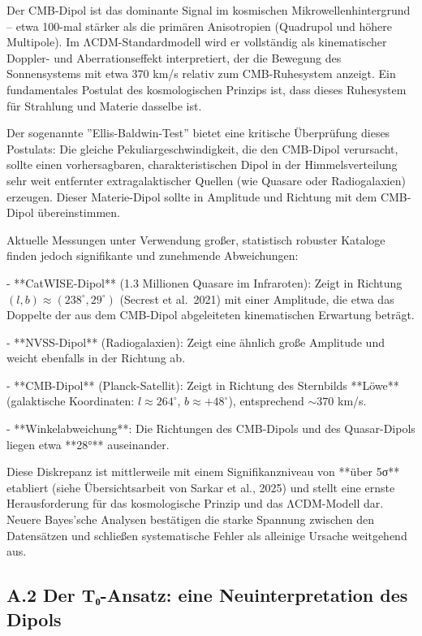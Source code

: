 Der CMB-Dipol ist das dominante Signal im kosmischen Mikrowellenhintergrund – etwa 100-mal stärker als die primären Anisotropien (Quadrupol und höhere Multipole). Im ΛCDM-Standardmodell wird er vollständig als kinematischer Doppler- und Aberrationseffekt interpretiert, der die Bewegung des Sonnensystems mit etwa 370 km/s relativ zum CMB-Ruhesystem anzeigt. Ein fundamentales Postulat des kosmologischen Prinzips ist, dass dieses Ruhesystem für Strahlung und Materie dasselbe ist.

Der sogenannte ''Ellis-Baldwin-Test'' bietet eine kritische Überprüfung dieses Postulats: Die gleiche Pekuliargeschwindigkeit, die den CMB-Dipol verursacht, sollte einen vorhersagbaren, charakteristischen Dipol in der Himmelsverteilung sehr weit entfernter extragalaktischer Quellen (wie Quasare oder Radiogalaxien) erzeugen. Dieser Materie-Dipol sollte in Amplitude und Richtung mit dem CMB-Dipol übereinstimmen.

Aktuelle Messungen unter Verwendung großer, statistisch robuster Kataloge finden jedoch signifikante und zunehmende Abweichungen:

- **CatWISE-Dipol** (1.3 Millionen Quasare im Infraroten): Zeigt in Richtung $(l, b) \approx (238^\circ, 29^\circ)$ (Secrest et al.\ 2021) mit einer Amplitude, die etwa das Doppelte der aus dem CMB-Dipol abgeleiteten kinematischen Erwartung beträgt.

- **NVSS-Dipol** (Radiogalaxien): Zeigt eine ähnlich große Amplitude und weicht ebenfalls in der Richtung ab.

- **CMB-Dipol** (Planck-Satellit): Zeigt in Richtung des Sternbilds **Löwe** (galaktische Koordinaten: $l \approx 264^\circ$, $b \approx +48^\circ$), entsprechend $\sim 370$ km/s.

- **Winkelabweichung**: Die Richtungen des CMB-Dipols und des Quasar-Dipols liegen etwa **28°** auseinander.

Diese Diskrepanz ist mittlerweile mit einem Signifikanzniveau von **über 5σ** etabliert (siehe Übersichtsarbeit von Sarkar et al., 2025) und stellt eine ernste Herausforderung für das kosmologische Prinzip und das ΛCDM-Modell dar. Neuere Bayes'sche Analysen bestätigen die starke Spannung zwischen den Datensätzen und schließen systematische Fehler als alleinige Ursache weitgehend aus.

\subsection*{A.2 Der T₀-Ansatz: eine Neuinterpretation des Dipols}

